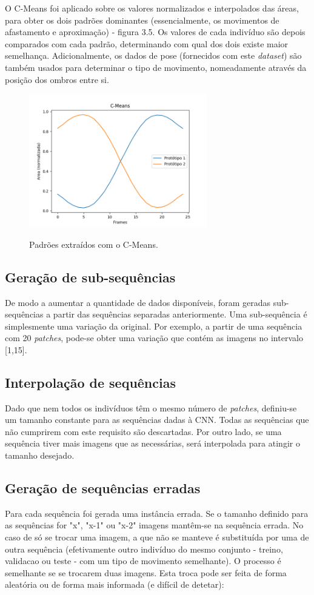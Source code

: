 \noindent O C-Means foi aplicado sobre os valores normalizados e interpolados das áreas, para obter os dois padrões dominantes (essencialmente, os movimentos de afastamento e aproximação) - figura 3.5. Os valores de cada indivíduo são depois comparados com cada padrão, determinando com qual dos dois existe maior semelhança. Adicionalmente, os dados de pose (fornecidos com este \textit{dataset}) são também usados para determinar o tipo de movimento, nomeadamente através da posição dos ombros entre si.

\begin{figure}[h]
\centering
\includegraphics[width=220pt]{c-means_25.png}
\label{fig:c_means}
\caption{Padrões extraídos com o C-Means.}
\end{figure}

\subsection{Geração de sub-sequências}
\label{chap3:subsec:sub}
De modo a aumentar a quantidade de dados disponíveis, foram geradas sub-sequências a partir das sequências separadas anteriormente. Uma sub-sequência é simplesmente uma variação da original. Por exemplo, a partir de uma sequência com 20 \textit{patches}, pode-se obter uma variação que contém as imagens no intervalo [1,15].

\subsection{Interpolação de sequências}
\label{chap3:subsec:interpolar_seq}
Dado que nem todos os indivíduos têm o mesmo número de \textit{patches}, definiu-se um tamanho constante para as sequências dadas à \ac{CNN}. Todas as sequências que não cumprirem com este requisito são descartadas. Por outro lado, se uma sequência tiver mais imagens que as necessárias, será interpolada para atingir o tamanho desejado.

\subsection{Geração de sequências erradas}
\label{chap3:subsec:erradas}
Para cada sequência foi gerada uma instância errada. Se o tamanho definido para as sequências for "x", "x-1" ou "x-2" imagens mantêm-se na sequência errada. No caso de só se trocar uma imagem, a que não se manteve é substituída por uma de outra sequência (efetivamente outro indivíduo do mesmo conjunto - treino, validacao ou teste - com um tipo de movimento semelhante). O processo é semelhante se se trocarem duas imagens. Esta troca pode ser feita de forma aleatória ou de forma mais informada (e difícil de detetar):

